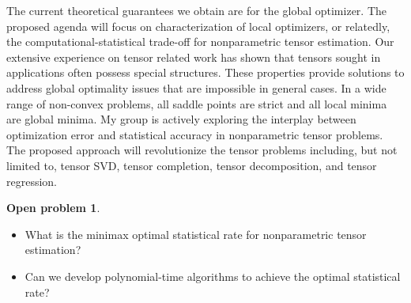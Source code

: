 \documentclass[11pt]{article}
\DeclareRobustCommand{\mybox}[2][gray!20]{%
\begin{tcolorbox}[   %
        breakable,
        left=0pt,
        right=0pt,
        top=0pt,
        bottom=0pt,
        colback=#1,
        colframe=#1,
        width=\dimexpr\textwidth\relax, 
        enlarge left by=0mm,
        boxsep=5pt,
        arc=0pt,outer arc=0pt,
        ]
        #2
\end{tcolorbox}}
\DeclareRobustCommand{\mybox}[2][gray!20]{%
\begin{tcolorbox}[   %
        breakable,
        left=0pt,
        right=0pt,
        top=0pt,
        bottom=0pt,
        colback=#1,
        colframe=#1,
        width=\dimexpr\textwidth\relax, 
        enlarge left by=0mm,
        boxsep=5pt,
        arc=0pt,outer arc=0pt,
        ]
        #2
\end{tcolorbox}
}
\theoremstyle{exampstyle}
\theoremstyle{definition}
\newtheorem{open}[]{Open problem}
\begin{document}
   
 
 \begin{table}[http]
 \vspace{-.2cm}
\vspace{-.3cm}
\caption{Comparison of statistical convergence rate between our nonparametric tensor models and previous methods.}\label{compare}
  \vspace{-.3cm}
\end{table}

The current theoretical guarantees we obtain are for the global optimizer. The proposed agenda will focus on characterization of local optimizers, or relatedly, the computational-statistical trade-off for nonparametric tensor estimation. Our extensive experience on tensor related work has shown that tensors sought in applications often possess special structures. These properties provide solutions to address global optimality issues that are impossible in general cases. In a wide range of non-convex problems, all saddle points are strict and all local minima are global minima. My group is actively exploring the interplay between optimization error and statistical accuracy in nonparametric tensor problems. The proposed approach will revolutionize the tensor problems including, but not limited to, tensor SVD, tensor completion, tensor decomposition, and tensor regression.
\mybox[gray!20]{
\begin{open}
\begin{itemize}[wide]\hfill
\item 
What is the minimax optimal statistical rate for nonparametric tensor estimation? 
\item Can we develop polynomial-time algorithms to achieve the optimal statistical rate?
\end{itemize}
\end{open}
}
\end{document}
